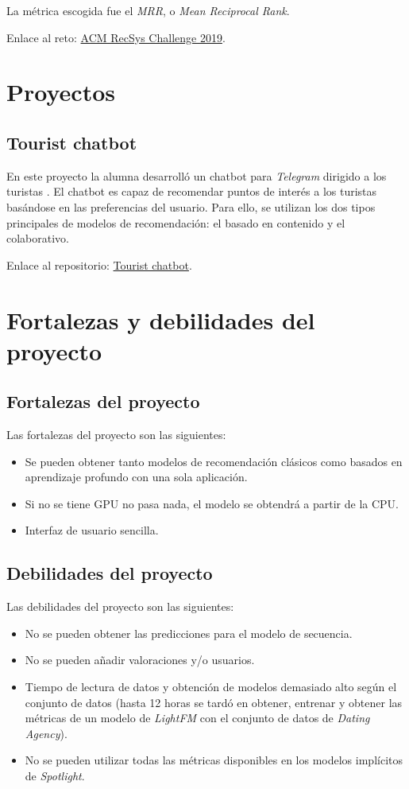 La métrica escogida fue el \textit{MRR}, o \textit{Mean Reciprocal Rank}.

Enlace al reto: \href{http://www.recsyschallenge.com/2019/}{ACM RecSys Challenge 2019}.

\section{Proyectos}\label{proyectos}
\subsection{Tourist chatbot}\label{chatbot}
En este proyecto la alumna desarrolló un chatbot para \textit{Telegram} dirigido a los turistas \cite{chatbot}. El chatbot es capaz de recomendar puntos de interés a los turistas basándose en las preferencias del usuario. Para ello, se utilizan los dos tipos principales de modelos de recomendación: el basado en contenido y el colaborativo.

Enlace al repositorio: \href{https://github.com/jaswellnitz/tourist-chatbot}{Tourist chatbot}.

\section{Fortalezas y debilidades del proyecto}\label{fortalezas-debilidades}
\subsection{Fortalezas del proyecto}\label{fortalezas}
Las fortalezas del proyecto son las siguientes:
\begin{itemize}
\tightlist
\item Se pueden obtener tanto modelos de recomendación clásicos como basados en aprendizaje profundo con una sola aplicación.
\item Si no se tiene GPU no pasa nada, el modelo se obtendrá a partir de la CPU.
\item Interfaz de usuario sencilla.
\end{itemize}

\subsection{Debilidades del proyecto}\label{debilidades}
Las debilidades del proyecto son las siguientes:
\begin{itemize}
\tightlist
\item No se pueden obtener las predicciones para el modelo de secuencia.
\item No se pueden añadir valoraciones y/o usuarios.
\item Tiempo de lectura de datos y obtención de modelos demasiado alto según el conjunto de datos (hasta 12 horas se tardó en obtener, entrenar y obtener las métricas de un modelo de \textit{LightFM} con el conjunto de datos de \textit{Dating Agency}).
\item No se pueden utilizar todas las métricas disponibles en los modelos implícitos de \textit{Spotlight}.
\end{itemize}
